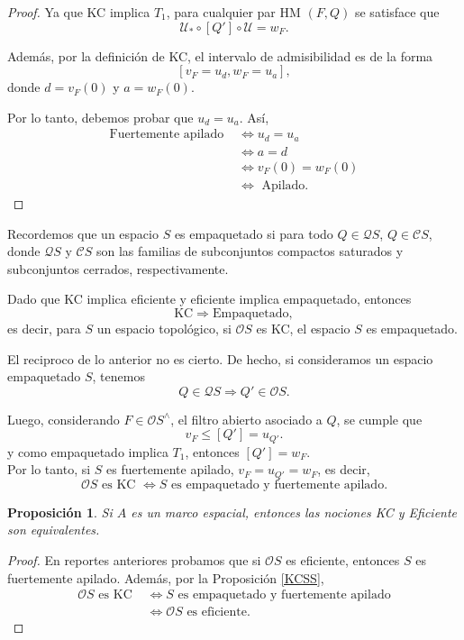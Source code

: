 \documentclass[12pt]{article}
\newtheorem{prop}[thm]{Proposición}
\begin{document}
\begin{proof}
    Ya que KC implica $T_1$, para cualquier par HM $(F,Q)$ se satisface que 
    \[
    \mathcal{U}_*\circ [Q']\circ \mathcal{U}=w_F.
    \]

    Además, por la definición de KC, el intervalo de admisibilidad es de la forma
    \[
    [v_F=u_d, w_F=u_a],
    \]
    donde $d=v_F(0)$ y $a=w_F(0)$.

    Por lo tanto, debemos probar que $u_d=u_a$. Así,
    \begin{equation}\label{ud=ua}
    \begin{split}
    \text{Fuertemente apilado }&\iff u_d=u_a\\ 
    &\iff a=d\\ 
    &\iff v_F(0)=w_F(0)\\ 
    &\iff \text{ Apilado}.
    \end{split}
    \end{equation}
\end{proof}

Recordemos que un espacio $S$ es empaquetado si para todo $Q\in\mathcal{Q}S$, $Q\in \mathcal{C}S$, donde $\mathcal{Q}S$ y $\mathcal{C}S$ son 
las familias de subconjuntos compactos saturados y subconjuntos cerrados, respectivamente.

Dado que KC implica eficiente y eficiente implica empaquetado, entonces 
\[
\text{KC}\Rightarrow \text{Empaquetado},
\]
es decir, para $S$ un espacio topológico, si $\mathcal{O}S$ es KC, el espacio $S$ es empaquetado.

El reciproco de lo anterior no es cierto. De hecho, si consideramos un espacio empaquetado $S$, tenemos
\[
Q\in \mathcal{Q}S\Rightarrow Q'\in \mathcal{O}S.
\]

Luego, considerando $F\in \mathcal{O}S^\wedge$, el filtro abierto asociado a $Q$, se cumple que
\[
v_F\leq [Q']=u_{Q'}.
\]
y como empaquetado implica $T_1$, entonces $[Q']=w_F$.\\

Por lo tanto, si $S$ es fuertemente apilado, $v_F=u_{Q'}=w_F$, es decir, 
\[
\mathcal{O}S \text{ es KC }\iff S\text{ es empaquetado y fuertemente apilado}.
\]

\begin{prop}
    Si $A$ es un marco espacial, entonces las nociones KC y Eficiente son equivalentes.
\end{prop}

\begin{proof}
    En reportes anteriores probamos que si $\mathcal{O}S$ es eficiente, entonces $S$ es fuertemente apilado. Además, 
    por la Proposición \ref{KCSS},
    \[
    \begin{split}
    \mathcal{O}S \text{ es KC }&\iff S\text{ es empaquetado y fuertemente apilado}\\
    &\iff \mathcal{O}S\text{ es eficiente}.
    \end{split}
    \]
\end{proof}
\end{document}

